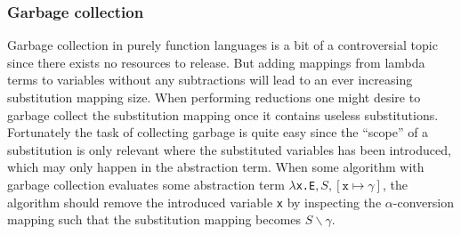 \documentclass[11pt,oneside,a4paper]{report}
\begin{document}
\subsubsection{Garbage collection}
Garbage collection in purely function languages is a bit of a controversial topic since there exists no resources to release.
But adding mappings from lambda terms to variables without any subtractions will lead to an ever increasing substitution mapping size.
When performing reductions one might desire to garbage collect the substitution mapping once it contains useless substitutions.
Fortunately the task of collecting garbage is quite easy since the ``scope'' of a substitution is only relevant where the substituted variables has been introduced, which may only happen in the abstraction term.
When some algorithm with garbage collection evaluates some abstraction term \texttt{$\lambda$x.E}$,S,[\texttt{x} \mapsto \gamma]$, the algorithm should remove the introduced variable \texttt{x} by inspecting the $\alpha$-conversion mapping such that the substitution mapping becomes $S\backslash \gamma$.
\end{document}
